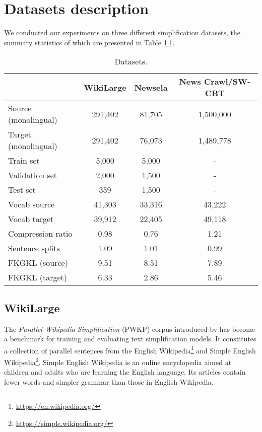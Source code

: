 \chapter{Datasets description}
\label{chap:datasets}

We conducted our experiments on three different simplification datasets, the summary statistics of which are presented in Table \ref{tab:datasets}.

\begin{table}[h]
\centering
\begin{tabular}{m{5cm}ccc}
\hline
\textbf{} & \textbf{WikiLarge} & \textbf{Newsela} & \textbf{News Crawl/SW-CBT} \\
\hline
Source (monolingual) & 291,402 & 81,705 & 1,500,000 \\
Target (monolingual) & 291,402 & 76,073 & 1,489,778 \\
Train set & 5,000 & 5,000 & - \\
Validation set & 2,000 & 1,500 & - \\
Test set & 359 & 1,500 & - \\
Vocab source  & 41,303 & 33,316 & 43,222 \\
Vocab target & 39,912 & 22,405 & 49,118 \\
Compression ratio & 0.98 & 0.76 & 1.21 \\
Sentence splits & 1.09 & 1.01 & 0.99 \\
FKGKL (source) & 9.51 & 8.51 & 7.89 \\
FKGKL (target) & 6.33 & 2.86 & 5.46 \\
\hline
\end{tabular}
\caption{Datasets.}
\label{tab:datasets}
\end{table}

\section{WikiLarge}

The \emph{Parallel Wikipedia Simplification} (PWKP) corpus introduced by \cite{zhu-etal-2010-monolingual} has become a benchmark for training and evaluating text simplification models. It constitutes a collection of parallel sentences from the English Wikipedia\footnote{\href{https://en.wikipedia.org/}{https://en.wikipedia.org/}} and Simple English Wikipedia\footnote{\href{https://simple.wikipedia.org/}{https://simple.wikipedia.org/}}. Simple English Wikipedia is an online encyclopedia aimed at children and adults who are learning the English language. Its articles contain fewer words and simpler grammar than those in English Wikipedia.

